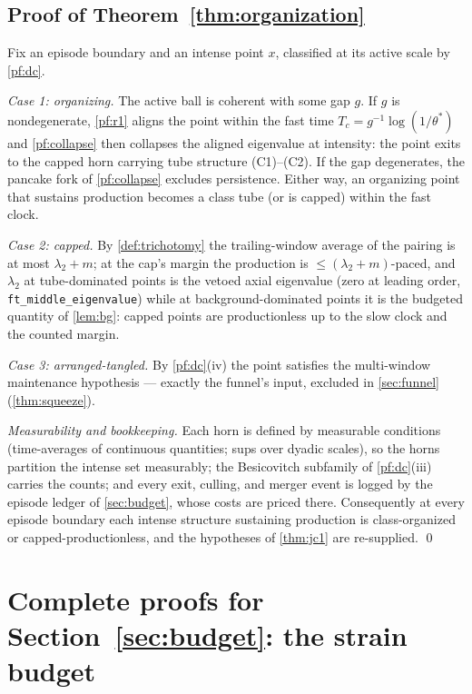 \documentclass[11pt,letterpaper]{amsart}
\theoremstyle{definition}
\theoremstyle{remark}
\begin{document}
\subsection{Proof of Theorem~\ref{thm:organization}}\label{pf:organization}
Fix an episode boundary and an intense point $x$, classified at its active scale by
\cref{pf:dc}.

\emph{Case 1: organizing.} The active ball is coherent with some gap $g$. If
$g$ is nondegenerate, \cref{pf:r1} aligns the point within the fast time
$T_c=g^{-1}\log(1/\theta^*)$ and \cref{pf:collapse} then collapses the aligned
eigenvalue at intensity: the point exits to the capped horn carrying tube structure
(C1)--(C2). If the gap degenerates, the pancake fork of \cref{pf:collapse} excludes
persistence. Either way, an organizing point that sustains production becomes a class
tube (or is capped) within the fast clock.

\emph{Case 2: capped.} By \cref{def:trichotomy} the trailing-window average of the
pairing is at most $\lambda_2+m$; at the cap's margin the production is
$\le(\lambda_2+m)$-paced, and $\lambda_2$ at tube-dominated points is the vetoed
axial eigenvalue (zero at leading order, \texttt{ft\_middle\_eigenvalue}) while at
background-dominated points it is the budgeted quantity of \cref{lem:bg}: capped
points are productionless up to the slow clock and the counted margin.

\emph{Case 3: arranged-tangled.} By \cref{pf:dc}(iv) the point satisfies the
multi-window maintenance hypothesis --- exactly the funnel's input, excluded in
\cref{sec:funnel} (\cref{thm:squeeze}).

\emph{Measurability and bookkeeping.} Each horn is defined by measurable conditions
(time-averages of continuous quantities; sups over dyadic scales), so the horns
partition the intense set measurably; the Besicovitch subfamily of \cref{pf:dc}(iii)
carries the counts; and every exit, culling, and merger event is logged by the
episode ledger of \cref{sec:budget}, whose costs are priced there. Consequently at
every episode boundary each intense structure sustaining production is
class-organized or capped-productionless, and the hypotheses of \cref{thm:jc1} are
re-supplied. \qed


\section{Complete proofs for Section~\ref{sec:budget}: the strain budget}\label{pfsec:budget}
\end{document}
